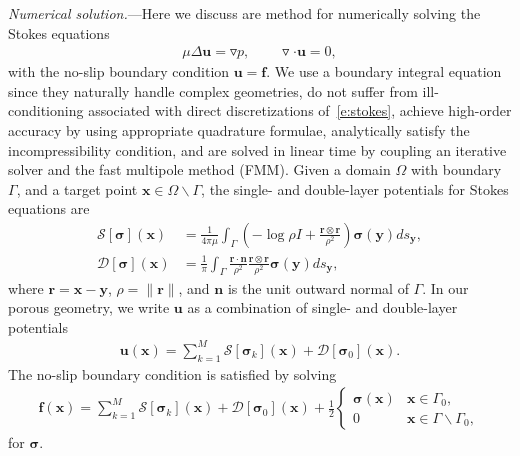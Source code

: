 \documentclass[twocolumn,showpacs,pre,preprintnumbers,floatfix]{revtex4-1}
\newcommand{\ff}{{\mathbf{f}}}
\newcommand{\nn}{{\mathbf{n}}}
\newcommand{\rr}{{\mathbf{r}}}
\newcommand{\ssigma}{{\boldsymbol{\sigma}}}
\newcommand{\uu}{{\mathbf{u}}}
\newcommand{\xx}{{\mathbf{x}}}
\newcommand{\yy}{{\mathbf{y}}}
\newcommand{\grad}{{\triangledown}}
\renewcommand{\SS}{{\mathcal{S}}}
\newcommand{\DD}{{\mathcal{D}}}
\begin{document}
{\em Numerical solution.}---Here we discuss are method for numerically
solving the Stokes equations
\begin{align}
  \mu \Delta \uu  = \grad p, \qquad \grad \cdot \uu = 0,
  \label{e:stokes}
\end{align}
with the no-slip boundary condition $\uu = \ff$.  We use a boundary
integral equation since they naturally handle complex geometries, do
not suffer from ill-conditioning associated with direct discretizations
of~\eqref{e:stokes}, achieve high-order accuracy by using appropriate
quadrature formulae, analytically satisfy the incompressibility
condition, and are solved in linear time by coupling an iterative
solver and the fast multipole method (FMM).  Given a domain $\Omega$
with boundary $\Gamma$, and a target point $\xx \in \Omega \backslash
\Gamma$, the single- and double-layer potentials for Stokes equations
are~\cite{poz1992}
\begin{align*}
  \SS[\ssigma](\xx) &= \frac{1}{4\pi\mu}\int_{\Gamma} \left(
  -\log\rho I + \frac{\rr \otimes\rr}{\rho^{2}} 
  \right)\ssigma(\yy)ds_{\yy},  \\
  \DD[\ssigma](\xx) &= \frac{1}{\pi}\int_{\Gamma} 
  \frac{\rr \cdot \nn}{\rho^{2}}\frac{\rr \otimes \rr}{\rho^{2}}
  \ssigma(\yy)ds_{\yy},
\end{align*}
where $\rr = \xx - \yy$, $\rho = \|\rr\|$, and $\nn$ is the unit outward
normal of $\Gamma$.  In our porous geometry, we write $\uu$ as a
combination of single- and double-layer potentials
\begin{align}
  \uu(\xx) = \sum_{k=1}^{M} \SS[\ssigma_{k}](\xx) + 
    \DD[\ssigma_{0}](\xx).
  \label{e:integralRep}
\end{align}
The no-slip boundary condition is satisfied by solving 
\begin{align}
  \ff(\xx) = \sum_{k=1}^{M} \SS[\ssigma_{k}](\xx) + 
    \DD[\ssigma_{0}](\xx) + 
    \frac{1}{2}\left\{
    \begin{array}{cl}
      \ssigma(\xx) & \xx \in \Gamma_{0}, \\
      0 & \xx \in \Gamma \backslash \Gamma_{0},
    \end{array}
    \right.
    \label{e:integralEqn}
\end{align}
for $\ssigma$.
\end{document}

